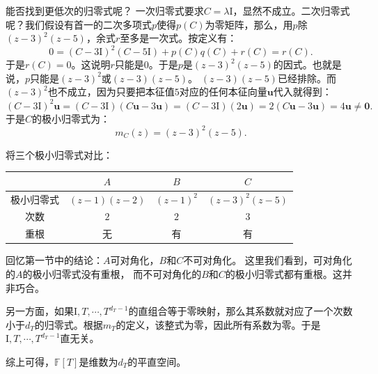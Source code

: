 \documentclass[12pt,UTF8,fontset=none]{ctexbook}
\begin{document}
能否找到更低次的归零式呢？
一次归零式要求$C = \lambda\mathrm{I}$，显然不成立。二次归零式呢？我们假设有首一的二次多项式$p$使得$p(C) $为零矩阵，那么，用$p$除$(z-3)^2(z-5)$，余式$r$至多是一次式。按定义有：
$$ 0 = (C-3\mathrm{I})^2(C-5\mathrm{I}) + p(C)q(C) + r(C) = r(C).$$
于是$r(C) = 0$。这说明$r$只能是$0$。于是$p$是$(z-3)^2(z-5)$的因式。也就是说，$p$只能是$(z-3)^2$或$(z-3)(z-5)$。
$(z-3)(z-5)$已经排除。而$(z-3)^2$也不成立，因为只要把本征值$5$对应的任何本征向量$\mathbf{u}$代入就得到：
$$ 
(C - 3\mathrm{I})^2\mathbf{u} = (C - 3\mathrm{I})(C\mathbf{u} - 3\mathbf{u}) = (C - 3\mathrm{I})(2\mathbf{u}) = 2(C\mathbf{u} - 3\mathbf{u}) = 4\mathbf{u} \neq \mathbf{0}.
$$
于是$C$的极小归零式为：
$$
m_C(z) = (z-3)^2(z-5).
$$

将三个极小归零式对比：
\begin{center}
\begin{tabular}{|c|c|c|c|}
\hline
 & $A$ & $B$ & $C$ \\
\hline
极小归零式 & $(z-1)(z-2)$ & \phantom{.2)}$(z-1)^2$\phantom{.2)} & $(z-3)^2(z-5)$ \\
次数 & $2$ & $2$ & $3$ \\
重根 & 无 & 有 & 有 \\
\hline
\end{tabular}
\end{center}

回忆第一节中的结论：$A$可对角化，$B$和$C$不可对角化。
这里我们看到，可对角化的$A$的极小归零式没有重根，
而不可对角化的$B$和$C$的极小归零式都有重根。这并非巧合。

另一方面，如果$\mathrm{I}, T, \cdots , T^{d_T - 1}$的直组合等于零映射，那么其系数就对应了一个次数小于$d_T$的归零式。根据$m_T$的定义，该整式为零，因此所有系数为零。于是$\mathrm{I}, T , \cdots , T^{d_T - 1}$直无关。

综上可得，$\mathbb{F}[T]$是维数为$d_T$的平直空间。
\end{document}
